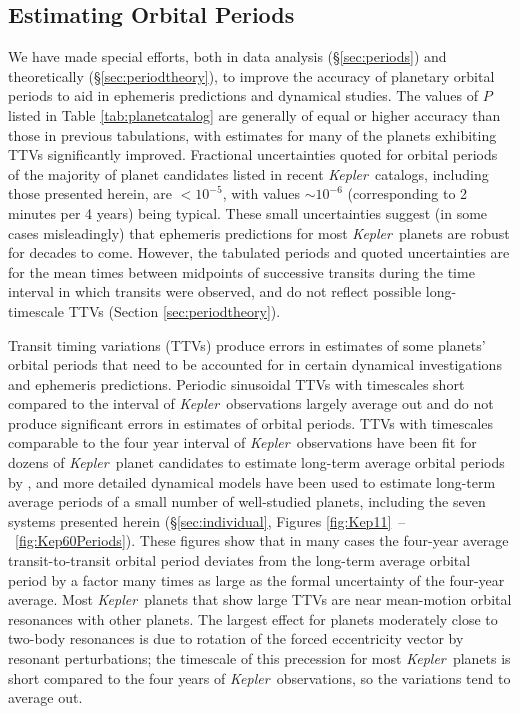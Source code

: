 \documentclass{aastex62}
\newcommand{\ik}{{\it Kepler~}}
\begin{document}
\subsection{Estimating Orbital Periods}  \label{sec:Pconclusions}

We have made special efforts, both in data analysis (\S\ref{sec:periods}) and theoretically (\S\ref{sec:periodtheory}), to improve the accuracy of planetary orbital periods to aid in ephemeris predictions and dynamical studies. The values of $P$ listed in Table \ref{tab:planetcatalog} are generally of equal or higher accuracy than those in previous tabulations, with estimates for many of the planets exhibiting TTVs significantly improved.
Fractional uncertainties quoted for orbital periods of the majority of planet candidates listed in recent \ik catalogs, including those presented herein, are $<10^{-5}$, with values $\sim 10^{-6}$ (corresponding to 2 minutes per 4 years) being typical.  These small uncertainties suggest {(in some cases misleadingly)} that ephemeris predictions for most \ik planets are robust for decades to come.  However, the tabulated periods and quoted uncertainties are for the mean times between midpoints of successive transits during the time interval in which transits were observed, and do not reflect possible long-timescale TTVs (Section \ref{sec:periodtheory}). 

Transit timing variations (TTVs) produce errors in estimates of some planets' orbital periods that need to be accounted for in certain dynamical investigations and ephemeris predictions.
Periodic sinusoidal TTVs with timescales short compared to the interval of \ik observations largely average out and do not produce significant errors in estimates of orbital periods.  TTVs with timescales comparable to the four year interval of \ik observations have been fit for dozens of \ik planet candidates to estimate long-term average orbital periods by \cite{Holczer:2016}, and more detailed dynamical models have been used to estimate long-term average periods of a small number of well-studied planets, including the seven systems presented herein (\S\ref{sec:individual}, Figures \ref{fig:Kep11}~--~\ref{fig:Kep60Periods}). 
{These figures show that in many cases the four-year average transit-to-transit orbital period deviates from the long-term average orbital period by a factor many times as large as the formal uncertainty of the four-year average.} Most \ik planets that show large TTVs are near mean-motion orbital resonances with other planets. The largest effect for planets moderately close to two-body resonances is due to rotation of the forced eccentricity vector by resonant perturbations; the timescale of this precession for most \ik planets is short compared to  the four years of \ik observations, so the variations tend to average out.
\end{document}
